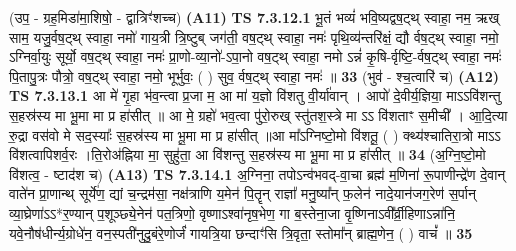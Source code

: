 \documentclass[17pt]{extarticle}
\begin{document}
                  \newline
                      (उप॒ - ग्रह॒मिडा॑मा॒शिषो॒ - द्वात्रिꣳ॑शच्च)  \textbf{(A11)} \newline \newline
                                        \textbf{ TS 7.3.12.1} \newline
                  भू॒तं भव्यं॑ भवि॒ष्यद्वष॒ट्थ् स्वाहा॒ नम॒ ऋख् साम॒ यजु॒र्वष॒ट्थ् स्वाहा॒ नमो॑ गाय॒त्री त्रि॒ष्टुब् जग॑ती॒ वष॒ट्थ् स्वाहा॒ नमः॑ पृथि॒व्य॑न्तरि॑क्षं॒ द्यौ र्वष॒ट्थ् स्वाहा॒ नमो॒ ऽग्निर्वा॒युः सूर्यो॒ वष॒ट्थ् स्वाहा॒ नमः॑ प्रा॒णो-व्या॒नो॑-ऽपा॒नो वष॒ट्थ् स्वाहा॒ नमो ऽन्नं॑ कृ॒षि-र्वृष्टि॒-र्वष॒ट्थ् स्वाहा॒ नमः॑ पि॒तापु॒त्रः पौत्रो॒ वष॒ट्थ् स्वाहा॒ नमो॒ भूर्भुवः॒ ( ) सुव॒ र्वष॒ट्थ् स्वाहा॒ नमः॑ ॥ \textbf{  33 } \newline
                  \newline
                      (भुव॑ - श्च॒त्वारि॑ च)  \textbf{(A12)} \newline \newline
                                        \textbf{ TS 7.3.13.1} \newline
                  आ मे॑ गृ॒हा भ॑व॒न्त्वा प्र॒जा म॒ आ मा॑ य॒ज्ञो वि॑शतु वी॒र्या॑वान् । आपो॑ दे॒वीर्य॒ज्ञिया॒ माऽऽवि॑शन्तु स॒हस्र॑स्य मा भू॒मा मा प्र हा॑सीत् ॥ आ मे॒ ग्रहो॑ भव॒त्वा पु॑रो॒रुख् स्तु॑तश॒स्त्रे मा ऽऽ वि॑शताꣳ स॒मीची᳚ । आ॒दि॒त्या रु॒द्रा वस॑वो मे सद॒स्याः᳚ स॒हस्र॑स्य मा भू॒मा मा प्र हा॑सीत् ॥आ मा᳚ऽग्निष्टो॒मो वि॑शतू॒ ( ) क्थ्य॑श्चातिरा॒त्रो माऽऽ वि॑शत्वापिशर्व॒रः ।ति॒रोअ॑ह्निया मा॒ सुहु॑ता॒ आ वि॑शन्तु स॒हस्र॑स्य मा भू॒मा मा प्र हा॑सीत् ॥ \textbf{  34 } \newline
                  \newline
                      (अ॒ग्नि॒ष्टो॒मो वि॑शत्व॒ - ष्टाद॑श च)  \textbf{(A13)} \newline \newline
                                        \textbf{ TS 7.3.14.1} \newline
                  अ॒ग्निना॒ तपोऽन्व॑भवद्-वा॒चा ब्रह्म॑ म॒णिना॑ रू॒पाणीन्द्रे॑ण दे॒वान् वाते॑न प्रा॒णान्थ् सूर्ये॑ण॒ द्यां च॒न्द्रम॑सा॒ नक्ष॑त्राणि य॒मेन॑ पि॒तॄन् राज्ञा᳚ मनु॒ष्या᳚न् फ॒लेन॑ नादे॒यान॑जग॒रेण॑ स॒र्पान् व्या॒घ्रेणा॑ऽऽ*र॒ण्यान् प॒शूञ्छ्ये॒नेन॑ पत॒त्रिणो॒ वृष्णाऽश्वा॑नृष॒भेण॒ गा ब॒स्तेना॒जा वृ॒ष्णिनाऽवी᳚र्व्री॒हिणाऽन्ना॑नि॒ यवे॒नौष॑धीर्न्य॒ग्रोधे॑न॒ वन॒स्पती॑नुदु॒बंरे॒णोर्जं॑ गायत्रि॒या छन्दाꣳ॑सि त्रि॒वृता॒ स्तोमा᳚न् ब्राह्म॒णेन॒ ( ) वाचं᳚ ॥ \textbf{  35} \newline
                  \newline
\end{document}

